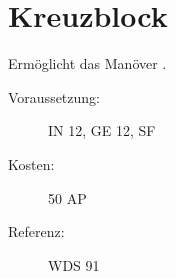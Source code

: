 \section{Kreuzblock}
\label{sf.kreuzblock}
Ermöglicht das Manöver .
\begin{description}
    \item[Voraussetzung:]
        IN 12, GE 12, SF 
    \item [Kosten:]
        50 AP
    \item [Referenz:]
        WDS 91
\end{description}

